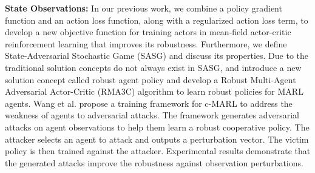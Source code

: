 \documentclass[acmsmall]{acmart}
\begin{document}
\textbf{State Observations:} In our previous work\cite{zhou2022romfac}, 
we combine a policy gradient function and an action loss function, along with a regularized action loss term, to develop a new objective function for training actors in mean-field actor-critic reinforcement learning \cite{pmlr-v80-yang18d} that improves its robustness. Furthermore, we define State-Adversarial Stochastic Game (SASG) and discuss its properties. 
Due to the traditional solution concepts do not always exist in SASG, \cite{han2022solution} and \cite{he2023robust} introduce a new solution concept called robust agent policy and develop a Robust Multi-Agent Adversarial Actor-Critic (RMA3C) algorithm to learn robust policies for MARL agents.
Wang et al. \cite{wang2023robust} propose a training framework for c-MARL to address the weakness of agents to adversarial attacks. The framework generates adversarial attacks on agent observations to help them learn a robust cooperative policy. The attacker selects an agent to attack and outputs a perturbation vector. The victim policy is then trained against the attacker. Experimental results demonstrate that the generated attacks improve the robustness against observation perturbations. 
\end{document}
